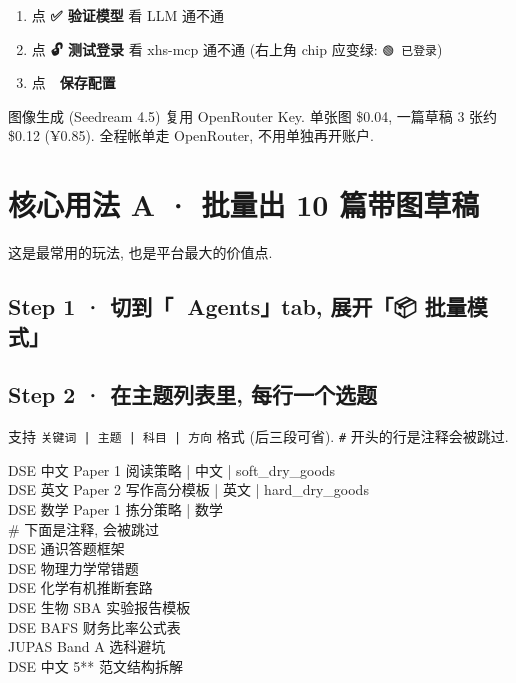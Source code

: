 \documentclass[11pt,a4paper]{article}
\begin{document}
\begin{enumerate}[leftmargin=*]
  \item 点 \textbf{✅ 验证模型} 看 LLM 通不通
  \item 点 \textbf{🔓 测试登录} 看 xhs-mcp 通不通 (右上角 chip 应变绿: \texttt{🟢 已登录})
  \item 点 \textbf{💾 保存配置}
\end{enumerate}

\begin{warnbox}
\small
图像生成 (Seedream 4.5) 复用 OpenRouter Key. 单张图 \$0.04, 一篇草稿 3 张约 \$0.12 (¥0.85).
全程帐单走 OpenRouter, 不用单独再开账户.
\end{warnbox}

\section{核心用法 A · 批量出 10 篇带图草稿}

这是最常用的玩法, 也是平台最大的价值点.

\subsection{Step 1 · 切到「🤖 Agents」tab, 展开「📦 批量模式」}

\subsection{Step 2 · 在主题列表里, 每行一个选题}

支持 \texttt{关键词 | 主题 | 科目 | 方向} 格式 (后三段可省). \texttt{\#} 开头的行是注释会被跳过.

\begin{cmdbox}
DSE 中文 Paper 1 阅读策略 | 中文 | soft\_dry\_goods\\
DSE 英文 Paper 2 写作高分模板 | 英文 | hard\_dry\_goods\\
DSE 数学 Paper 1 拣分策略 | 数学\\
\# 下面是注释, 会被跳过\\
DSE 通识答题框架\\
DSE 物理力学常错题\\
DSE 化学有机推断套路\\
DSE 生物 SBA 实验报告模板\\
DSE BAFS 财务比率公式表\\
JUPAS Band A 选科避坑\\
DSE 中文 5** 范文结构拆解
\end{cmdbox}
\end{document}
